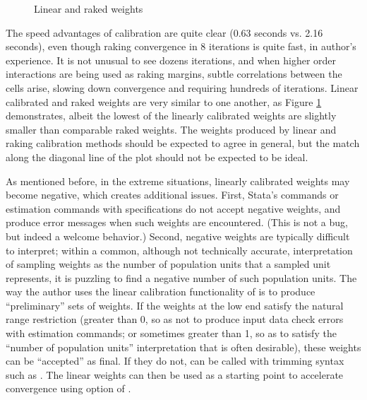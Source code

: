 \bigskip

\begin{stlog}
\nullskip
\end{stlog}

\begin{figure}[hb!]
    \begin{center}
    \end{center}
    \caption{Linear and raked weights}
    \label{fig:linear:raked}
\end{figure}

\clearpage

The speed advantages of  calibration are quite clear (0.63 seconds vs. 2.16 seconds),
even though raking convergence in 8 iterations is quite fast, in author's experience.
It is not unusual to see dozens iterations, and when higher order interactions are being used as
raking margins, subtle correlations between the cells arise, slowing down convergence and requiring
hundreds of iterations.
Linear calibrated and raked weights are very similar to one another, as Figure \ref{fig:linear:raked}
demonstrates, albeit the lowest of the linearly
calibrated weights are slightly smaller than comparable raked weights.
The weights produced by linear and raking calibration methods should be expected to agree in general,
but the match along the diagonal line of the plot should not be expected to be ideal.

As mentioned before, in the extreme situations, linearly calibrated weights
may become negative, which creates additional issues.  First, Stata's 
commands or estimation commands with  specifications do not accept
negative weights, and produce error messages when such weights are encountered.
(This is not a bug, but indeed a welcome behavior.) Second, negative weights are
typically difficult to interpret; within a common, although not technically accurate,
interpretation of sampling weights as the number of population units that a sampled
unit represents, it is puzzling to find a negative number of such population units.
The way the author uses the linear calibration functionality of 
is to produce ``preliminary'' sets of weights. If the weights at the low end
satisfy the natural range restriction (greater than 0, so as not to produce
input data check errors with estimation commands; or sometimes greater than 1,
so as to satisfy the ``number of population units'' interpretation that is often
desirable), these weights can be ``accepted'' as final. If they do not,
 can be called with trimming syntax such as .
The linear weights can then be used as a starting point to accelerate convergence
using  option of .

